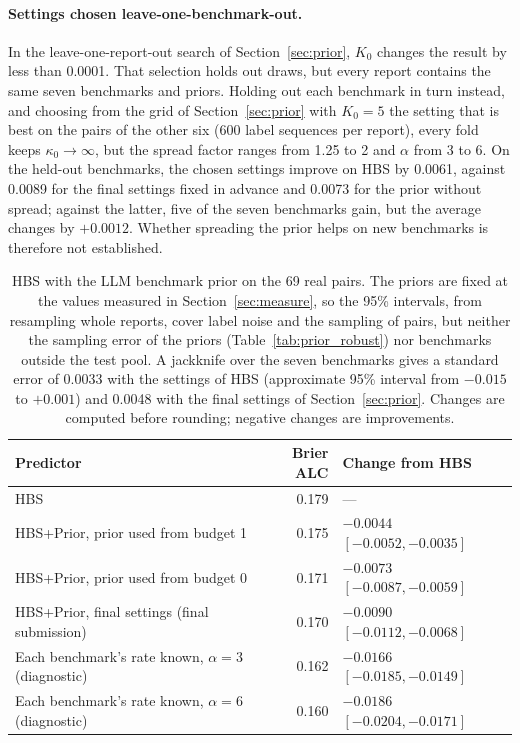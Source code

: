 \documentclass{article}
\begin{document}
\paragraph{Settings chosen leave-one-benchmark-out.} In the leave-one-report-out search of Section~\ref{sec:prior}, $K_0$ changes the result by less than 0.0001. That selection holds out draws, but every report contains the same seven benchmarks and priors. Holding out each benchmark in turn instead, and choosing from the grid of Section~\ref{sec:prior} with $K_0 = 5$ the setting that is best on the pairs of the other six (600 label sequences per report), every fold keeps $\kappa_0 \to \infty$, but the spread factor ranges from 1.25 to 2 and $\alpha$ from 3 to 6. On the held-out benchmarks, the chosen settings improve on HBS by 0.0061, against 0.0089 for the final settings fixed in advance and 0.0073 for the prior without spread; against the latter, five of the seven benchmarks gain, but the average changes by $+0.0012$. Whether spreading the prior helps on new benchmarks is therefore not established.

\begin{table}[ht]
  \caption{HBS with the LLM benchmark prior on the 69 real pairs. The priors are fixed at the values measured in Section~\ref{sec:measure}, so the 95\% intervals, from resampling whole reports, cover label noise and the sampling of pairs, but neither the sampling error of the priors (Table~\ref{tab:prior_robust}) nor benchmarks outside the test pool. A jackknife over the seven benchmarks gives a standard error of 0.0033 with the settings of HBS (approximate 95\% interval from $-0.015$ to $+0.001$) and 0.0048 with the final settings of Section~\ref{sec:prior}. Changes are computed before rounding; negative changes are improvements.}
  \label{tab:prior}
  \centering
  \small
  \begin{tabular}{lrl}
    \toprule
    Predictor & Brier ALC & Change from HBS \\
    \midrule
    HBS & 0.179 & --- \\
    HBS+Prior, prior used from budget 1 & 0.175 & $-0.0044$ $[-0.0052, -0.0035]$ \\
    HBS+Prior, prior used from budget 0 & 0.171 & $-0.0073$ $[-0.0087, -0.0059]$ \\
    HBS+Prior, final settings (final submission) & 0.170 & $-0.0090$ $[-0.0112, -0.0068]$ \\
    Each benchmark's rate known, $\alpha = 3$ (diagnostic) & 0.162 & $-0.0166$ $[-0.0185, -0.0149]$ \\
    Each benchmark's rate known, $\alpha = 6$ (diagnostic) & 0.160 & $-0.0186$ $[-0.0204, -0.0171]$ \\
    \bottomrule
  \end{tabular}
\end{table}
\end{document}
